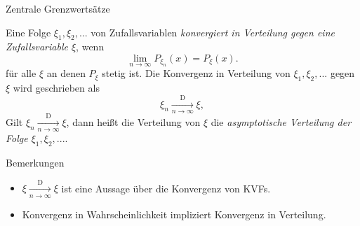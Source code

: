 \documentclass[
  8pt,
  ignorenonframetext,
]{beamer}
\providecommand{\tightlist}{%
  \setlength{\itemsep}{0pt}\setlength{\parskip}{0pt}}
\begin{document}
\begin{frame}{Zentrale Grenzwertsätze}
\protect\hypertarget{zentrale-grenzwertsuxe4tze-1}{}
\footnotesize
\begin{definition}
\justifying
Eine Folge $\xi_1,\xi_2,...$ von Zufallsvariablen \textit{konvergiert in Verteilung
gegen eine Zufallsvariable $\xi$}, wenn
\begin{equation}
\lim_{n \to \infty} P_{\xi_n}(x) = P_\xi(x).
\end{equation}
für alle $\xi$ an denen $P_\xi$ stetig ist.
Die Konvergenz in Verteilung von $\xi_1,\xi_2,...$ gegen $\xi$ wird geschrieben als
\begin{equation}
\xi_n\xrightarrow[n\to \infty]{\text{D}} \xi,
\end{equation}
Gilt $\xi_n\xrightarrow[n\to \infty]{\text{D}} \xi$, dann heißt die Verteilung von
$\xi$ die \textit{asymptotische Verteilung der Folge $\xi_1,\xi_2,...$}.
\end{definition}
\footnotesize

Bemerkungen

\begin{itemize}
\tightlist
\item
  \(\xi\xrightarrow[n\to \infty]{\text{D}} \xi\) ist eine Aussage über
  die Konvergenz von KVFs.
\item
  Konvergenz in Wahrscheinlichkeit impliziert Konvergenz in Verteilung.
\end{itemize}
\end{frame}
\end{document}
